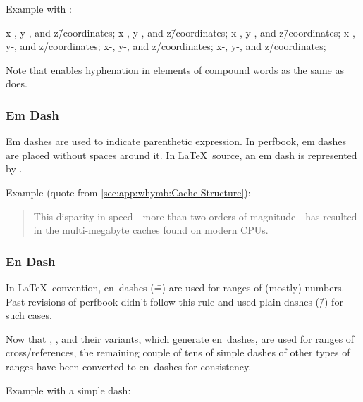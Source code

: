 Example with \qco{\\=/}:

\begin{center}\begin{minipage}{2.55in}\vspace{0.6\baselineskip}
x-, y-, and z\=/coordinates; x-, y-, and z\=/coordinates;
x-, y-, and z\=/coordinates; x-, y-, and z\=/coordinates;
x-, y-, and z\=/coordinates; x-, y-, and z\=/coordinates;
\vspace{0.6\baselineskip}\end{minipage}\end{center}

Note that \qco{\\=/} enables hyphenation in elements
of compound words as the same as \qco{\\-/} does.

\subsubsection{Em Dash}
\label{sec:app:styleguide:Em Dash}

Em dashes are used to indicate parenthetic expression. In perfbook,
em dashes are placed without spaces around it. In \LaTeX\ source,
an em dash is represented by \qco{---}.

Example (quote from \cref{sec:app:whymb:Cache Structure}):
\begin{quote}
  This disparity in speed---more than two orders of magnitude---has
  resulted in the multi-megabyte caches found on modern CPUs.
\end{quote}

\subsubsection{En Dash}
\label{sec:app;styleguide:En Dash}

In \LaTeX\ convention, en~dashes (\==) are used for ranges of (mostly)
numbers.
Past revisions of perfbook didn't follow this rule and used
plain dashes (\=/) for such cases.

Now that \co{\\clnrefrange}, \co{\\crefrange},
and their variants, which generate en~dashes, are used for ranges of
cross\-/references, the remaining couple of tens of simple dashes
of other types of ranges have been converted to en~dashes for
consistency.

Example with a simple dash:

